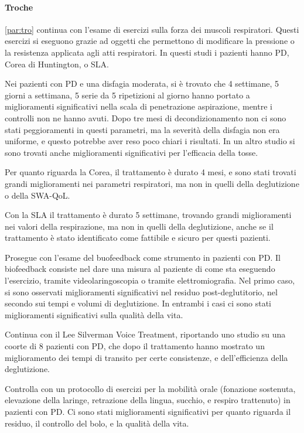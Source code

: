 \paragraph{Troche}\ref{par:tro} continua con l'esame di esercizi sulla forza 
dei muscoli respiratori.
Questi esercizi si eseguono grazie ad oggetti che permettono di modificare la 
pressione o la resistenza applicata agli atti respiratori.
In questi studi i pazienti hanno PD, Corea di Huntington, o SLA.

Nei pazienti con PD e una disfagia moderata, si è trovato che 4 settimane, 5 
giorni a settimana, 5 serie da 5 ripetizioni al giorno hanno portato a 
miglioramenti significativi nella scala di penetrazione aspirazione, mentre i 
controlli non ne hanno avuti.
Dopo tre mesi di decondizionamento non ci sono stati peggioramenti in questi 
parametri, ma la severità della disfagia non era uniforme, e questo potrebbe 
aver reso poco chiari i risultati.
In un altro studio si sono trovati anche miglioramenti significativi per 
l'efficacia della tosse.

Per quanto riguarda la Corea, il trattamento è durato 4 mesi, e sono stati 
trovati grandi miglioramenti nei parametri respiratori, ma non in quelli della 
deglutizione o della SWA-QoL.

Con la SLA il trattamento è durato 5 settimane, trovando grandi miglioramenti 
nei valori della respirazione, ma non in quelli della deglutizione, anche se il 
trattamento è stato identificato come fattibile e sicuro per questi pazienti.

Prosegue con l'esame del buofeedback come strumento in pazienti con PD.
Il biofeedback consiste nel dare una misura al paziente di come sta eseguendo 
l'esercizio, tramite videolaringoscopia o tramite elettromiografia.
Nel primo caso, si sono osservati miglioramenti significativi nel residuo 
post-deglutitorio, nel secondo sui tempi e volumi di deglutizione.
In entrambi i casi ci sono stati miglioramenti significativi sulla qualità 
della vita.

Continua con il Lee Silverman Voice Treatment, riportando uno studio su una 
coorte di 8 pazienti con PD, che dopo il trattamento hanno mostrato un 
miglioramento dei tempi di transito per certe consistenze, e dell'efficienza 
della deglutizione.

Controlla con un protocollo di esercizi per la mobilità orale (fonazione 
sostenuta, elevazione della laringe, retrazione della lingua, succhio, e 
respiro trattenuto) in pazienti con PD.
Ci sono stati miglioramenti significativi per quanto riguarda il residuo, il 
controllo del bolo, e la qualità della vita.

